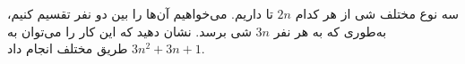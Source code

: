 \EXERCISE
سه نوع مختلف شی از هر کدام
$2n$
تا داریم. می‌خواهیم آن‌ها را بین دو نفر تقسیم کنیم، به‌طوری که به هر نفر
$3n$
شی برسد. نشان دهید که این کار را می‌توان به
$3n^2 + 3n + 1$
طریق مختلف انجام داد.